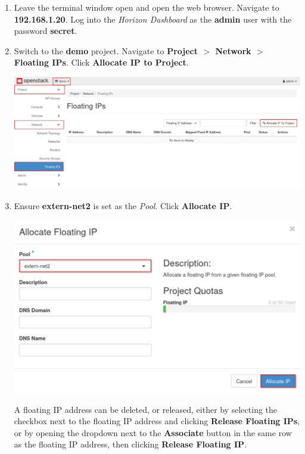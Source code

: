 \documentclass[letterpaper, 12pt]{article}
\begin{document}
\begin{enumerate}
    \item Leave the terminal window open and open the web browser. Navigate to \textbf{192.168.1.20}. Log into the
    \textit{Horizon Dashboard} as the \textbf{admin} user with the password \textbf{secret}.


    \item Switch to the \textbf{demo} project. Navigate to \textbf{Project $>$ Network $>$ Floating IPs}. Click
    \textbf{Allocate IP to Project}.

    \begin{center}
        \includegraphics[width=\linewidth]{images/part3/step4.png}
    \end{center}

    \item Ensure \textbf{extern-net2} is set as the \textit{Pool}. Click \textbf{Allocate IP}.
    
    \begin{center}
        \includegraphics[width=\linewidth]{images/part3/step5.png}
    \end{center}

    \begin{tipbox}
        A floating IP address can be deleted, or released, either by selecting the checkbox next to the floating IP
        address and clicking \textbf{Release Floating IPs}, or by opening the dropdown next to the \textbf{Associate}
        button in the same row as the floating IP address, then clicking \textbf{Release Floating IP}.
    \end{tipbox}


\end{enumerate}
\end{document}
